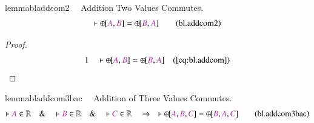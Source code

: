 \begin{restatable}{lemma}{bladdcom2}~~ Addition Two Values Commutes.
\begin{align}
\vdash {\oplus\hspace{-1pt}[} \mc{A} , \mc{B} ] = {\oplus\hspace{-1pt}[} \mc{B}
    , \mc{A} ]\label{eq:bl.addcom2}\tag{bl.addcom2}
\end{align}
\end{restatable}

\begin{proof}
\begin{align}
  1 &&  & \vdash {\oplus\hspace{-1pt}[} \mc{A} , \mc{B} ] =
      {\oplus\hspace{-1pt}[} \mc{B} , \mc{A}
      ]&(\mbox{\ref{eq:bl.addcom}})\notag
\end{align}
\end{proof}

\begin{restatable}{lemma}{bladdcom3bac}~~ Addition of Three Values Commutes.
\begin{align}
\vdash \mc{A} \in \mathbb{R}\quad\&\quad \vdash \mc{B} \in
    \mathbb{R}\quad\&\quad \vdash \mc{C} \in \mathbb{R}\quad\Rightarrow\quad
    \vdash {\oplus\hspace{-1pt}[} \mc{A} , \mc{B} , \mc{C} ] =
    {\oplus\hspace{-1pt}[} \mc{B} , \mc{A} , \mc{C}
    ]\label{eq:bl.addcom3bac}\tag{bl.addcom3bac}
\end{align}
\end{restatable}

